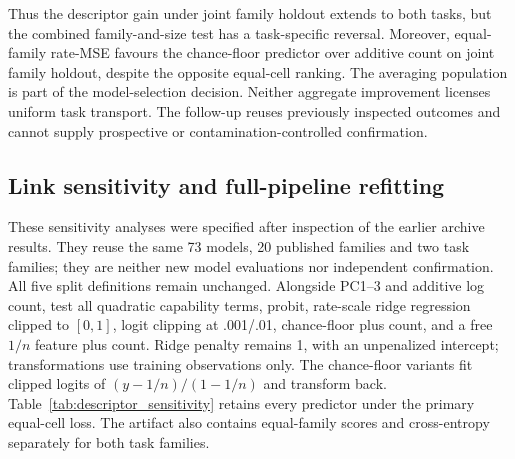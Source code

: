 \begin{table}[htbp]\centering\small
\caption{Follow-up joint holdouts. Lower is better; identical test cells and fixed predictors for each comparison. Equal-family scores average the 20 published model-family means. These are post-result archive challenges, not prospective or independent confirmation.}
\label{tab:joint}

\end{table}



Thus the descriptor gain under joint family holdout extends to both tasks, but the combined family-and-size test has a task-specific reversal. Moreover, equal-family rate-MSE favours the chance-floor predictor over additive count on joint family holdout, despite the opposite equal-cell ranking. The averaging population is part of the model-selection decision. Neither aggregate improvement licenses uniform task transport. The follow-up reuses previously inspected outcomes and cannot supply prospective or contamination-controlled confirmation.


\subsection{Link sensitivity and full-pipeline refitting}
\label{app:robustness}
These sensitivity analyses were specified after inspection of the earlier archive results. They reuse the same 73 models, 20 published families and two task families; they are neither new model evaluations nor independent confirmation. All five split definitions remain unchanged. Alongside PC1--3 and additive log count, test all quadratic capability terms, probit, rate-scale ridge regression clipped to $[0,1]$, logit clipping at .001/.01, chance-floor plus count, and a free $1/n$ feature plus count. Ridge penalty remains 1, with an unpenalized intercept; transformations use training observations only. The chance-floor variants fit clipped logits of $(y-1/n)/(1-1/n)$ and transform back. Table~\ref{tab:descriptor_sensitivity} retains every predictor under the primary equal-cell loss. The artifact also contains equal-family scores and cross-entropy separately for both task families.

\begin{table}[htbp]\centering\small
\caption{Exploratory descriptor sensitivities: rate-MSE on identical cells. ``Out'' denotes exclusion from training; joint excludes both model and task families. No hyperparameter is selected on these holdouts.}
\label{tab:descriptor_sensitivity}

\end{table}

